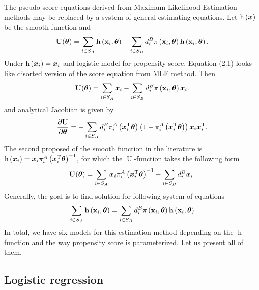 \documentclass[
  letterpaper,
  DIV=11,
  numbers=noendperiod]{scrreprt}
\begin{document}
The pseudo score equations derived from Maximum Likelihood Estimation
methods may be replaced by a system of general estimating equations. Let
\(\operatorname{h}\left(\boldsymbol{x}\right)\) be the smooth function and \[
\begin{equation}
\mathbf{U}(\btheta)=\sum_{i \in S_A} \mathbf{h}\left(\mathbf{x}_i, \btheta\right)-\sum_{i \in S_B} d_i^B \pi\left(\mathbf{x}_i, \btheta\right) \mathbf{h}\left(\mathbf{x}_i, \btheta\right).
\end{equation}
\] Under \(\operatorname{h}\left(\boldsymbol{x}_i\right) = \boldsymbol{x}_i\) and logistic
model for propensity score, Equation (2.1) looks like disorted version
of the score equation from MLE method. Then \[
\begin{align*}
    \mathbf{U}(\boldsymbol{\theta})=\sum_{i \in S_A} \boldsymbol{x}_i -\sum_{i \in S_B} d_i^B \pi\left(\mathbf{x}_i, \boldsymbol{\theta}\right) \boldsymbol{x}_i.
\end{align*}
\] and analytical Jacobian is given by \[
\begin{align*} 
\frac{\partial \mathbf{U}}{\partial\boldsymbol{\theta}} = - \sum_{i \in S_B} d_i^B \pi_i^A\left(\boldsymbol{x}_i^{\mathrm{T}} \boldsymbol{\theta} \right) \left(1 -  \pi_i^A\left(\boldsymbol{x}_i^{\mathrm{T}} \boldsymbol{\theta} \right)\right)\boldsymbol{x}_i \boldsymbol{x}_i^{\mathrm{T}}.
\end{align*}
\] The second proposed of the smooth function in the literature is
\(\operatorname{h}\left(\boldsymbol{x}_i\right) = \boldsymbol{x}_i \pi_i^A\left(\boldsymbol{x}_i^{\mathrm{T}} \boldsymbol{\theta} \right)^{-1}\),
for which the \(\operatorname{U}\)-function takes the following form \[
\begin{align}
    \mathbf{U}(\boldsymbol{\theta})=\sum_{i \in S_A}  \boldsymbol{x}_i \pi_i^A\left(\boldsymbol{x}_i^{\mathrm{T}} \boldsymbol{\theta} \right)^{-1} -\sum_{i \in S_B} d_i^B \boldsymbol{x}_i.
\end{align}
\] Generally, the goal is to find solution for following system of
equations \[
\begin{equation*}
    \sum_{i \in S_A} \mathbf{h}\left(\mathbf{x}_i, \btheta\right) = \sum_{i \in S_B} d_i^B \pi\left(\mathbf{x}_i, \btheta\right) \mathbf{h}\left(\mathbf{x}_i, \btheta\right)
\end{equation*}
\] In total, we have six models for this estimation method depending on
the \(\operatorname{h}\)-function and the way propensity score is
parameterized. Let us present all of them.

\hypertarget{logistic-regression-1}{%
\subsection{Logistic regression}\label{logistic-regression-1}}
\end{document}
